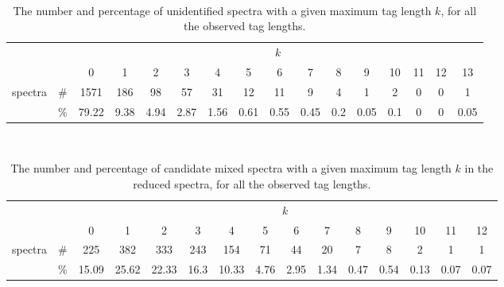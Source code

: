 \documentclass{article}
\begin{document}
\begin{table}[h]
\vspace{3mm}\
{\centering
\begin{center}
\begin{tabular}{|c|c|
c|c|c|c|c|c|c|c|c|c|c|c|c|c|}
  \hline
  \multicolumn{2}{|c|}{} & \multicolumn{ 14}{|c|}{$k$} \\
  \cline{3-16}
  \multicolumn{2}{|c|}{} 
 & 0 & 1 & 2 & 3 & 4 & 5 & 6 & 7 & 8 & 9 & 10 & 11 & 12 & 13\\
  \hline
  \multirow{2}{*}{spectra} & \#
 & 1571 & 186 & 98 & 57 & 31 & 12 & 11 & 9 & 4 & 1 & 2 & 0 & 0 & 1\\
   & \%
 & 79.22 & 9.38 & 4.94 & 2.87 & 1.56 & 0.61 & 0.55 & 0.45 & 0.2 & 0.05 & 0.1 & 0 & 0 & 0.05\\
  \hline
\end{tabular}
\end{center}
\par}
\centering
\caption{The number and percentage of unidentified spectra with a given maximum tag length $k$, for all the observed tag lengths.}
\vspace{3mm}
\label{table:unident-tags}
\end{table}
\begin{table}[h]
\vspace{3mm}\
{\centering
\begin{center}
\begin{tabular}{|c|c|
c|c|c|c|c|c|c|c|c|c|c|c|c|}
  \hline
  \multicolumn{2}{|c|}{} & \multicolumn{ 13}{|c|}{$k$} \\
  \cline{3-15}
  \multicolumn{2}{|c|}{} 
 & 0 & 1 & 2 & 3 & 4 & 5 & 6 & 7 & 8 & 9 & 10 & 11 & 12\\
  \hline
  \multirow{2}{*}{spectra} & \#
 & 225 & 382 & 333 & 243 & 154 & 71 & 44 & 20 & 7 & 8 & 2 & 1 & 1\\
   & \%
 & 15.09 & 25.62 & 22.33 & 16.3 & 10.33 & 4.76 & 2.95 & 1.34 & 0.47 & 0.54 & 0.13 & 0.07 & 0.07\\
  \hline
\end{tabular}
\end{center}
\par}
\centering
\caption{The number and percentage of candidate mixed spectra with a given maximum tag length $k$ in the reduced spectra, for all the observed tag lengths.}
\vspace{3mm}
\label{table:mixed-tags}
\end{table}
\end{document}

